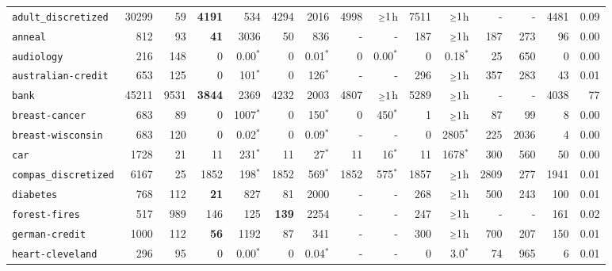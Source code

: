 \begin{tabular}{lccrrrrrrrrrrrr}
\texttt{adult\_discretized} & \multicolumn{1}{r}{30299} & \multicolumn{1}{r}{59}  & \textbf{4191} & 534 & 4294 & 2016 & 4998 & $\mathsmaller{\geq}1$h & 7511 & $\mathsmaller{\geq}1$h & - & - & 4481 & 0.09\\
\texttt{anneal} & \multicolumn{1}{r}{812} & \multicolumn{1}{r}{93}  & \textbf{41} & 3036 & 50 & 836 & - & - & 187 & $\mathsmaller{\geq}1$h & 187 & 273 & 96 & 0.00\\
\texttt{audiology} & \multicolumn{1}{r}{216} & \multicolumn{1}{r}{148}  & 0 & 0.00$^*$ & 0 & 0.01$^*$ & 0 & 0.00$^*$ & 0 & 0.18$^*$ & 25 & 650 & 0 & 0.00\\
\texttt{australian-credit} & \multicolumn{1}{r}{653} & \multicolumn{1}{r}{125}  & 0 & 101$^*$ & 0 & 126$^*$ & - & - & 296 & $\mathsmaller{\geq}1$h & 357 & 283 & 43 & 0.01\\
\texttt{bank} & \multicolumn{1}{r}{45211} & \multicolumn{1}{r}{9531}  & \textbf{3844} & 2369 & 4232 & 2003 & 4807 & $\mathsmaller{\geq}1$h & 5289 & $\mathsmaller{\geq}1$h & - & - & 4038 & 77\\
\texttt{breast-cancer} & \multicolumn{1}{r}{683} & \multicolumn{1}{r}{89}  & 0 & 1007$^*$ & 0 & 150$^*$ & 0 & 450$^*$ & 1 & $\mathsmaller{\geq}1$h & 87 & 99 & 8 & 0.00\\
\texttt{breast-wisconsin} & \multicolumn{1}{r}{683} & \multicolumn{1}{r}{120}  & 0 & 0.02$^*$ & 0 & 0.09$^*$ & - & - & 0 & 2805$^*$ & 225 & 2036 & 4 & 0.00\\
\texttt{car} & \multicolumn{1}{r}{1728} & \multicolumn{1}{r}{21}  & 11 & 231$^*$ & 11 & 27$^*$ & 11 & 16$^*$ & 11 & 1678$^*$ & 300 & 560 & 50 & 0.00\\
\texttt{compas\_discretized} & \multicolumn{1}{r}{6167} & \multicolumn{1}{r}{25}  & 1852 & 198$^*$ & 1852 & 569$^*$ & 1852 & 575$^*$ & 1857 & $\mathsmaller{\geq}1$h & 2809 & 277 & 1941 & 0.01\\
\texttt{diabetes} & \multicolumn{1}{r}{768} & \multicolumn{1}{r}{112}  & \textbf{21} & 827 & 81 & 2000 & - & - & 268 & $\mathsmaller{\geq}1$h & 500 & 243 & 100 & 0.01\\
\texttt{forest-fires} & \multicolumn{1}{r}{517} & \multicolumn{1}{r}{989}  & 146 & 125 & \textbf{139} & 2254 & - & - & 247 & $\mathsmaller{\geq}1$h & - & - & 161 & 0.02\\
\texttt{german-credit} & \multicolumn{1}{r}{1000} & \multicolumn{1}{r}{112}  & \textbf{56} & 1192 & 87 & 341 & - & - & 300 & $\mathsmaller{\geq}1$h & 700 & 207 & 150 & 0.01\\
\texttt{heart-cleveland} & \multicolumn{1}{r}{296} & \multicolumn{1}{r}{95}  & 0 & 0.00$^*$ & 0 & 0.04$^*$ & - & - & 0 & 3.0$^*$ & 74 & 965 & 6 & 0.01\\

\end{tabular}
